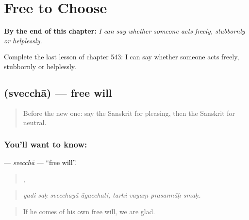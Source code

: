
\chapter{Free to Choose}
\label{ch:sa-free-to-choose}

\begin{chapteropening}
\textbf{By the end of this chapter:} \emph{I can say whether someone acts freely, stubbornly or helplessly.}

Complete the last lesson of chapter 543: I can say whether someone acts freely, stubbornly or helplessly.
\end{chapteropening}

\section[\texorpdfstring{\sk{स्वेच्छा} (svecchā)}{स्वेच्छा (svecchā)}]{ (svecchā) — free will}

\label{lesson:SA-C543-sveccha}



\begin{quote}
Before the new one: say the Sanskrit for pleasing, then the Sanskrit for neutral.
\end{quote}

\subsection*{You'll want to know: }
\textbf{} — \emph{svecchā} — \textquotedblleft{}free will\textquotedblright{}.

\begin{quote}
   ,    
\end{quote}

\begin{quote}
\emph{yadi saḥ svecchayā āgacchati, tarhi vayaṃ prasannāḥ smaḥ.}
\end{quote}

\begin{quote}
If he comes of his own free will, we are glad.
\end{quote}

